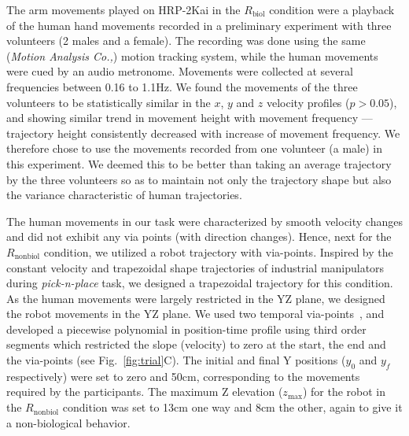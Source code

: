\documentclass[a4paper, 12pt, oneside]{Thesis}  %
\begin{document}
The arm movements played on HRP-2Kai in the $R_{\text{biol}}$ condition were a playback of the human hand movements recorded in a preliminary experiment with three volunteers (2 males and a female). The recording was done using the same ({\it Motion Analysis Co.,}) motion tracking system, while the human movements were cued by an audio metronome. Movements were collected at several frequencies between 0.16 to 1.1Hz. We found the movements of the three volunteers to be statistically similar in the $x$, $y$ and $z$ velocity profiles ($p > 0.05$), and showing similar trend in movement height with movement frequency ---trajectory height consistently decreased with increase of movement frequency. We therefore chose to use the movements recorded from one volunteer (a male) in this experiment. We deemed this to be better than taking an average trajectory by the three volunteers so as to maintain not only the trajectory shape but also the variance characteristic of human trajectories.                                

The human movements in our task were characterized by smooth velocity changes and did not exhibit any via points (with direction changes). Hence, next for the $R_{\text{nonbiol}}$ condition, we utilized a robot trajectory with via-points. Inspired by the constant velocity and trapezoidal shape trajectories of industrial manipulators during {\it pick-n-place} task, we designed a trapezoidal trajectory for this condition. As the human movements were largely restricted in the YZ plane, we designed the robot movements in the YZ plane. We used two temporal via-points~\cite{Biagiotti:Springer:2008}, and developed a piecewise polynomial in position-time profile using third order segments which restricted the slope (velocity) to zero at the start, the end and the via-points (see Fig.~\ref{fig:trial}C). The initial  and final Y positions ($y_0$ and $y_f$ respectively) were set to zero and 50cm, corresponding to the movements required by the participants. The maximum Z elevation ($z_{\max}$) for the robot in the $R_{\text{nonbiol}}$ condition was set to 13cm one way and 8cm the other, again to give it a non-biological behavior. 



\end{document}
